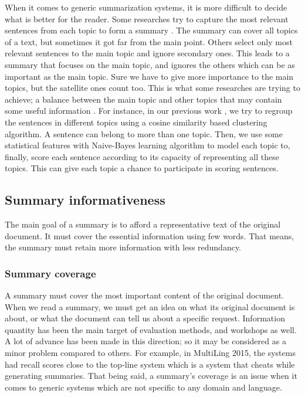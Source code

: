 When it comes to generic summarization systems, it is more difficult to decide what is better for the reader.
Some researches try to capture the most relevant sentences from each topic to form a summary \citep{11-song-al}. 
The summary can cover all topics of a text, but sometimes it got far from the main point.
%
Others select only most relevant sentences to the main topic and ignore secondary ones. 
This leads to a summary that focuses on the main topic, and ignores the others which can be as important as the main topic.
%
Sure we have to give more importance to the main topics, but the satellite ones count too. 
This is what some researches are trying to achieve; a balance between the main topic and other topics that may contain some useful information \citep{12-zhang-al,13-aries-al}. 
For instance, in our previous work \citep{13-aries-al}, we try to regroup the sentences in different topics using a cosine similarity based clustering algorithm. 
A sentence can belong to more than one topic. 
Then, we use some statistical features with Naive-Bayes learning algorithm to model each topic to, finally, score each sentence according to its capacity of representing all these topics. 
This can give each topic a chance to participate in scoring sentences.


\subsection{Summary informativeness}

The main goal of a summary is to afford a representative text of the original document. 
It must cover the essential information using few words. 
That means, the summary must retain more information with less redundancy. %

\subsubsection{Summary coverage}

A summary must cover the most important content of the original document. 
When we read a summary, we must get an idea on what its original document is about, or what the document can tell us about a specific request. 
Information quantity has been the main target of evaluation methods, and workshops as well. 
A lot of advance has been made in this direction; so it may be considered as a minor problem compared to others.
For example, in MultiLing 2015, the systems had recall scores close to the top-line system which is a system that cheats while generating summaries.
That being said, a summary's coverage is an issue when it comes to generic systems which are not specific to any domain and language.  


